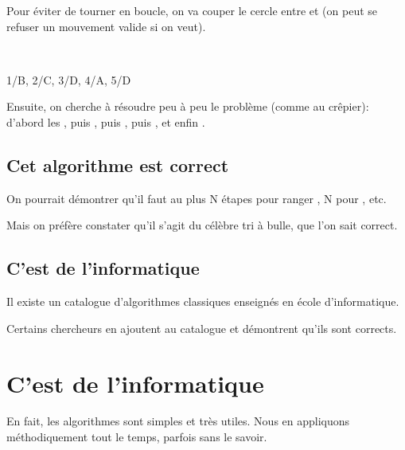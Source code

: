 \documentclass[a7paper,pagesize,DIV=14,10pt]{scrbook}
\begin{document}
Pour éviter de tourner en boucle, on va couper le cercle entre
 et  (on peut se refuser un mouvement valide si on
veut).

\begin{minipage}{.5\linewidth}
  \centerline{}
\end{minipage}~
\begin{minipage}{.5\linewidth}
              {1/B, 2/C, 3/D, 4/A, 5/D}

\end{minipage}


Ensuite, on cherche à résoudre peu à peu le problème (comme au
crêpier): d'abord les , puis , puis ,
puis , et enfin .

\vspace{-.8\baselineskip}
\subsection*{Cet algorithme est correct}
\vspace{-.5\baselineskip}

On pourrait démontrer qu'il faut au plus N étapes pour ranger
, N pour , etc.

Mais on préfère constater qu'il s'agit du célèbre tri à bulle, que
l'on sait correct.

\vspace{-.8\baselineskip}
\subsection*{C'est de l'informatique}
\vspace{-.5\baselineskip}

Il existe un catalogue d'algorithmes classiques enseignés en école
d'informatique.

Certains chercheurs en ajoutent au catalogue et démontrent qu'ils
sont corrects.


\newpage
\section*{C'est de l'informatique}
\vspace{-.5\baselineskip} %
En fait, les algorithmes sont simples et très utiles. Nous en
appliquons méthodiquement tout le temps, parfois sans le savoir.
\end{document}
